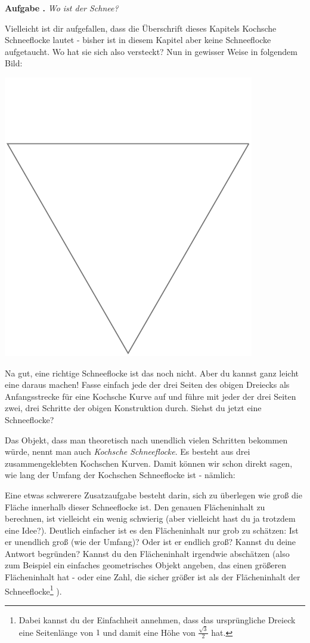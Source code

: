 \documentclass[a4paper,ngerman,12pt]{scrartcl}
\theoremstyle{definition}
\theoremstyle{plain}
\theoremstyle{remark}
\newlength{\aufgabenskip}
\newcounter{aufgabennummer}
\newenvironment{aufgabe}[1]{
  \addtocounter{aufgabennummer}{1}
  \textbf{Aufgabe \theaufgabennummer.} \emph{#1} \par
}{\vspace{\aufgabenskip}}
\begin{document}
\begin{aufgabe}{Wo ist der Schnee?}
Vielleicht ist dir aufgefallen, dass die Überschrift dieses Kapitels \glqq Kochsche Schneeflocke\grqq{} lautet - bisher ist in diesem Kapitel aber keine Schneeflocke aufgetaucht. Wo hat sie sich also versteckt? Nun in gewisser Weise in folgendem Bild:
	\begin{center}
		\includegraphics[width=.6\textwidth]{Bilder/Eigene_Schneeflocke.pdf}
	\end{center}	
Na gut, eine richtige Schneeflocke ist das noch nicht. Aber du kannst ganz leicht eine daraus machen! Fasse einfach jede der drei Seiten des obigen Dreiecks als Anfangsstrecke für eine Kochsche Kurve auf und führe mit jeder der drei Seiten zwei, drei Schritte der obigen Konstruktion durch. Siehst du jetzt eine Schneeflocke?

Das Objekt, dass man theoretisch \glqq nach unendlich vielen Schritten\grqq{} bekommen würde, nennt man auch \emph{Kochsche Schneeflocke}. Es besteht aus drei zusammengeklebten Kochschen Kurven. Damit können wir schon direkt sagen, wie lang der Umfang der Kochschen Schneeflocke ist - nämlich:

Eine etwas schwerere Zusatzaufgabe besteht darin, sich zu überlegen wie groß die Fläche innerhalb dieser Schneeflocke ist. Den genauen Flächeninhalt zu berechnen, ist vielleicht ein wenig schwierig (aber vielleicht hast du ja trotzdem eine Idee?). Deutlich einfacher ist es den Flächeninhalt nur grob zu schätzen: Ist er unendlich groß (wie der Umfang)? Oder ist er endlich groß? Kannst du deine Antwort begründen? Kannst du den Flächeninhalt irgendwie abschätzen (also zum Beispiel ein einfaches geometrisches Objekt angeben, das einen größeren Flächeninhalt hat - oder eine Zahl, die sicher größer ist als der Flächeninhalt der Schneeflocke\footnote{Dabei kannst du der Einfachheit annehmen, dass das ursprüngliche Dreieck eine Seitenlänge von $1$ und damit eine Höhe von $\frac{\sqrt{3}}{2}$ hat.} ).
\end{aufgabe}
\end{document}
